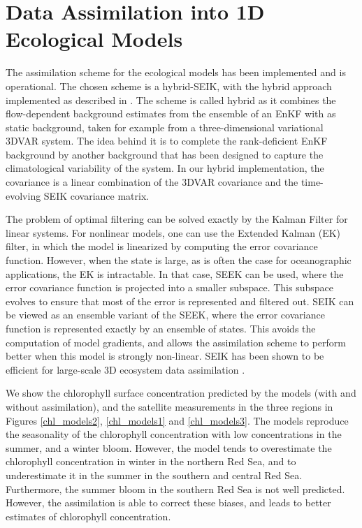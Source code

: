 \section{Data Assimilation into 1D Ecological Models}

The assimilation scheme for the ecological models has been implemented and is
operational. The chosen scheme is a hybrid-SEIK, with the hybrid approach
implemented as described in \citet{Hamill2000}.  The scheme is called hybrid as
it combines the flow-dependent background estimates from the ensemble of an
EnKF with as static background, taken for example from a three-dimensional
variational 3DVAR system. The idea behind it is to complete the rank-deficient
EnKF background by another background that has been designed to capture the
climatological variability of the system.  In our hybrid implementation, the
covariance is a linear combination of the 3DVAR covariance and the
time-evolving SEIK covariance matrix.

The problem of optimal filtering can be solved exactly by the Kalman Filter for
linear systems. For nonlinear models, one can use the Extended Kalman (EK)
filter, in which the model is linearized by computing the error covariance
function.  However, when the state is large, as is often the case for
oceanographic applications, the EK is intractable. In that case, SEEK can be
used, where the error covariance function is projected into a smaller subspace.
This subspace evolves to ensure that most of the error is represented and
filtered out. SEIK can be viewed as an ensemble variant of the SEEK, where the
error covariance function is represented exactly by an ensemble of states. This
avoids the computation of model gradients, and allows the assimilation scheme
to perform better when this model is strongly non-linear. SEIK has been shown
to be efficient for large-scale 3D ecosystem data assimilation
\citep{Triantafyllou2003}.

We show the chlorophyll surface concentration predicted by the models (with and
without assimilation), and the satellite measurements in the three regions in
Figures \ref{chl_models2}, \ref{chl_models1} and \ref{chl_models3}.  The models
reproduce the seasonality of the chlorophyll concentration with low
concentrations in the summer, and a winter bloom. However, the model tends to
overestimate the chlorophyll concentration in winter in the northern Red Sea,
and to underestimate it in the summer in the southern and central Red Sea.
Furthermore, the summer bloom in the southern Red Sea is not well predicted.
However, the assimilation is able to correct these biases, and leads to better
estimates of chlorophyll concentration.

